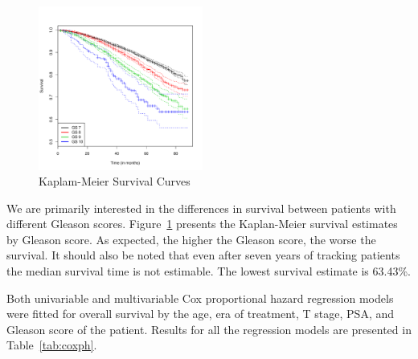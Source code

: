 \documentclass[letterpaper, 10pt]{article}\usepackage[]{graphicx}\usepackage[]{color}
\newenvironment{knitrout}{}{} %
\begin{document}
\begin{knitrout}
\color{fgcolor}\begin{figure}[]


{\centering \includegraphics[width=0.48\textwidth]{figure/km_plot} 

}

\caption[Kaplam-Meier Survival Curves]{Kaplam-Meier Survival Curves\label{fig:km_plot}}
\end{figure}


\end{knitrout}


We are primarily interested in the differences in survival between patients with
different Gleason scores.  Figure~\ref{fig:km_plot} presents the Kaplan-Meier
survival estimates by Gleason score.  As expected, the higher the Gleason score,
the worse the survival.  It should also be noted that even after seven years of
tracking patients the median survival time is not estimable.  The lowest
survival estimate is 63.43\%.

Both univariable and multivariable Cox proportional hazard regression models
were fitted for overall survival by the age, era of treatment, T stage, PSA, and
Gleason score of the patient.  Results for all the regression models are
presented in Table~\ref{tab:coxph}.  
\end{document}
